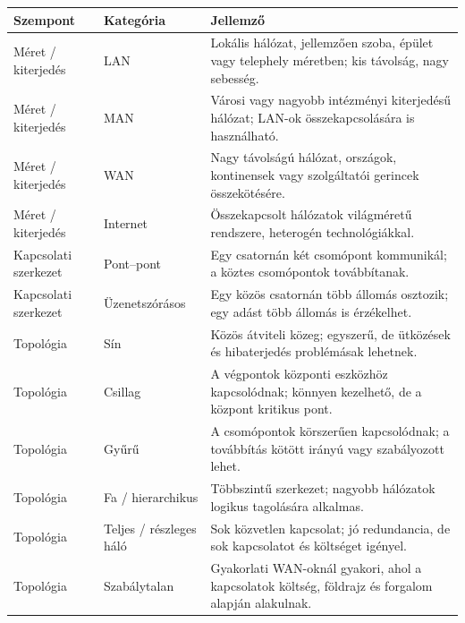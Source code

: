 \begin{tabularx}{\textwidth}{L{31mm}L{32mm}X}
\toprule
\textbf{Szempont} & \textbf{Kategória} & \textbf{Jellemző} \\
\midrule
Méret / kiterjedés & LAN & Lokális hálózat, jellemzően szoba, épület vagy telephely méretben; kis távolság, nagy sebesség. \\
Méret / kiterjedés & MAN & Városi vagy nagyobb intézményi kiterjedésű hálózat; LAN-ok összekapcsolására is használható. \\
Méret / kiterjedés & WAN & Nagy távolságú hálózat, országok, kontinensek vagy szolgáltatói gerincek összekötésére. \\
Méret / kiterjedés & Internet & Összekapcsolt hálózatok világméretű rendszere, heterogén technológiákkal. \\
Kapcsolati szerkezet & Pont--pont & Egy csatornán két csomópont kommunikál; a köztes csomópontok továbbítanak. \\
Kapcsolati szerkezet & Üzenetszórásos & Egy közös csatornán több állomás osztozik; egy adást több állomás is érzékelhet. \\
Topológia & Sín & Közös átviteli közeg; egyszerű, de ütközések és hibaterjedés problémásak lehetnek. \\
Topológia & Csillag & A végpontok központi eszközhöz kapcsolódnak; könnyen kezelhető, de a központ kritikus pont. \\
Topológia & Gyűrű & A csomópontok körszerűen kapcsolódnak; a továbbítás kötött irányú vagy szabályozott lehet. \\
Topológia & Fa / hierarchikus & Többszintű szerkezet; nagyobb hálózatok logikus tagolására alkalmas. \\
Topológia & Teljes / részleges háló & Sok közvetlen kapcsolat; jó redundancia, de sok kapcsolatot és költséget igényel. \\
Topológia & Szabálytalan & Gyakorlati WAN-oknál gyakori, ahol a kapcsolatok költség, földrajz és forgalom alapján alakulnak. \\
\bottomrule
\end{tabularx}
